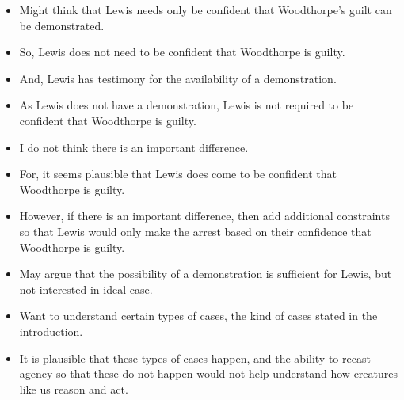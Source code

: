 \documentclass[10pt]{article}
\begin{document}
\begin{itemize}
\item Might think that Lewis needs only be confident that Woodthorpe's guilt can be demonstrated.
\item So, Lewis does not need to be confident that Woodthorpe is guilty.
\item And, Lewis has testimony for the availability of a demonstration.
\item As Lewis does not have a demonstration, Lewis is not required to be confident that Woodthorpe is guilty.
\item I do not think there is an important difference.
\item For, it seems plausible that Lewis does come to be confident that Woodthorpe is guilty.
\item However, if there is an important difference, then add additional constraints so that Lewis would only make the arrest based on their confidence that Woodthorpe is guilty.
\item May argue that the possibility of a demonstration is sufficient for Lewis, but not interested in ideal case.
\item Want to understand certain types of cases, the kind of cases {\color{red} stated in the introduction}.
\item It is plausible that these types of cases happen, and the ability to recast agency so that these do not happen would not help understand how creatures like us reason and act.
\end{itemize}
\end{document}
